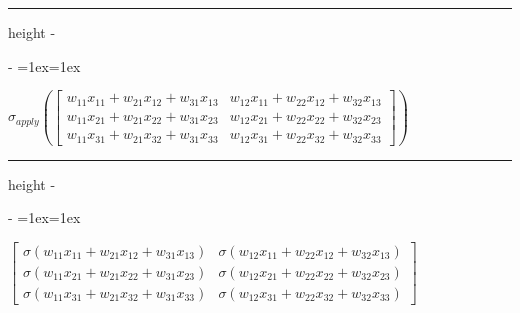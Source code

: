 \documentclass[letterpaper,10pt,english]{sphinxmanual}
\makeatletter
\newenvironment{nbsphinxfancyoutput}{%
    \let\sphinxincludegraphics\nbsphinxincludegraphics
    \nbsphinx@image@maxheight\textheight
    \advance\nbsphinx@image@maxheight -2\fboxsep   %
    \advance\nbsphinx@image@maxheight -2\fboxrule  %
    \advance\nbsphinx@image@maxheight -\baselineskip
\def\nbsphinxfcolorbox{\spx@fcolorbox{nbsphinx-code-border}{white}}%
\def\FrameCommand{\nbsphinxfcolorbox\nbsphinxfancyaddprompt\@empty}%
\def\FirstFrameCommand{\nbsphinxfcolorbox\nbsphinxfancyaddprompt\sphinxVerbatim@Continues}%
\def\MidFrameCommand{\nbsphinxfcolorbox\sphinxVerbatim@Continued\sphinxVerbatim@Continues}%
\def\LastFrameCommand{\nbsphinxfcolorbox\sphinxVerbatim@Continued\@empty}%
\MakeFramed{\advance\hsize-\width\@totalleftmargin\z@\linewidth\hsize\@setminipage}%
\lineskip=1ex\lineskiplimit=1ex\raggedright%
}{\par\unskip\@minipagefalse\endMakeFramed}
\def\nbsphinxfancyaddprompt{\ifvoid\nbsphinxpromptbox\else
    \kern\fboxrule\kern\fboxsep
    \copy\nbsphinxpromptbox
    \kern-\ht\nbsphinxpromptbox\kern-\dp\nbsphinxpromptbox
    \kern-\fboxsep\kern-\fboxrule\nointerlineskip
    \fi}
\newlength\nbsphinxcodecellspacing
\newcommand*{\nbsphinxincludegraphics}[2][]{%
    \gdef\spx@includegraphics@options{#1}%
    \setbox\spx@image@box\hbox{\texttt{[image: \#2]}}%
    \in@false
    \ifdim \wd\spx@image@box>\linewidth
      \g@addto@macro\spx@includegraphics@options{,width=\linewidth}%
      \in@true
    \fi
    \ifdim \ht\spx@image@box>\nbsphinx@image@maxheight
      \g@addto@macro\spx@includegraphics@options{,height=\nbsphinx@image@maxheight}%
      \in@true
    \fi
    \ifin@
      \g@addto@macro\spx@includegraphics@options{,keepaspectratio}%
    \fi
    \setbox\spx@image@box\box\voidb@x %
    \expandafter\includegraphics\expandafter[\spx@includegraphics@options]{#2}%
}%
\makeatother
\begin{document}
\hrule height -\fboxrule\relax
\vspace{\nbsphinxcodecellspacing}

\savebox\nbsphinxpromptbox[0pt][r]{\color{nbsphinxout}\Verb|\strut{[31]:}\,|}

\begin{nbsphinxfancyoutput}
$\displaystyle \sigma_{apply}{\left(\left[\begin{matrix}w_{11} x_{11} + w_{21} x_{12} + w_{31} x_{13} & w_{12} x_{11} + w_{22} x_{12} + w_{32} x_{13}\\w_{11} x_{21} + w_{21} x_{22} + w_{31} x_{23} & w_{12} x_{21} + w_{22} x_{22} + w_{32} x_{23}\\w_{11} x_{31} + w_{21} x_{32} + w_{31} x_{33} & w_{12} x_{31} + w_{22} x_{32} + w_{32} x_{33}\end{matrix}\right] \right)}$
\end{nbsphinxfancyoutput}

{
\begin{sphinxVerbatim}[commandchars=\\\{\}]
\llap{\color{nbsphinxin}[32]:\,\hspace{\fboxrule}\hspace{\fboxsep}}     
\end{sphinxVerbatim}
}

\hrule height -\fboxrule\relax
\vspace{\nbsphinxcodecellspacing}

\savebox\nbsphinxpromptbox[0pt][r]{\color{nbsphinxout}\Verb|\strut{[32]:}\,|}

\begin{nbsphinxfancyoutput}
$\displaystyle \left[\begin{matrix}\sigma{\left(w_{11} x_{11} + w_{21} x_{12} + w_{31} x_{13} \right)} & \sigma{\left(w_{12} x_{11} + w_{22} x_{12} + w_{32} x_{13} \right)}\\\sigma{\left(w_{11} x_{21} + w_{21} x_{22} + w_{31} x_{23} \right)} & \sigma{\left(w_{12} x_{21} + w_{22} x_{22} + w_{32} x_{23} \right)}\\\sigma{\left(w_{11} x_{31} + w_{21} x_{32} + w_{31} x_{33} \right)} & \sigma{\left(w_{12} x_{31} + w_{22} x_{32} + w_{32} x_{33} \right)}\end{matrix}\right]$
\end{nbsphinxfancyoutput}
\end{document}
